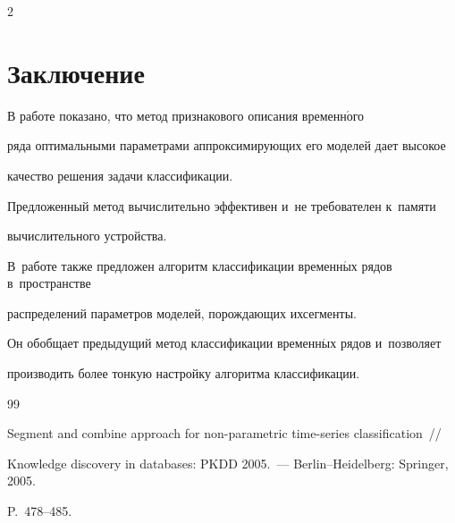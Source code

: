 \begin{multicols}{2}





\section{Заключение}





В работе показано, что метод признакового описания временн$\acute{\mbox{о}}$го 


ряда оптимальными параметрами аппроксимирующих его моделей дает высокое 


качество решения задачи классификации.


Предложенный метод вычислительно эффективен и~не требователен к~памяти 


вычислительного устройства.





В~работе также предложен алгоритм классификации временн$\acute{\mbox{ы}}$х рядов в~пространстве 


распределений параметров моделей, порождающих их\linebreak сегменты. 


Он обобщает предыдущий метод классификации временн$\acute{\mbox{ы}}$х рядов и~позволяет 


производить более тонкую настройку алгоритма клас\-си\-фи\-кации.


{ %





}





{\small\frenchspacing


 {%




 \begin{thebibliography}{99}






 Segment and combine approach for non-parametric time-series classification~//


{Knowledge discovery in databases: PKDD 2005}.~--- Berlin--Heidelberg: Springer, 2005. 


P.~478--485.






\end{thebibliography}}}
\end{multicols}
